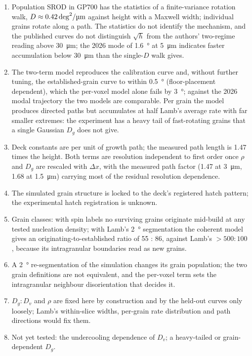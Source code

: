\documentclass[11pt,a4paper]{article}
\newcommand{\Dunit}{\si{deg\squared\per\micro\metre}}
\begin{document}
\begin{enumerate}
\item Population SROD in GP700 has the statistics of a finite-variance rotation walk, $D \approx \SI{0.42}{\Dunit}$ against height with a Maxwell width; individual grains rotate along a path. The statistics do not identify the mechanism, and the published curves do not distinguish $\sqrt{h}$ from the authors' two-regime reading above \SI{30}{\micro\metre}; the 2026 mode of \SI{1.6}{\degree} at \SI{5}{\micro\metre} indicates faster accumulation below \SI{30}{\micro\metre} than the single-$D$ walk gives.
\item The two-term model reproduces the calibration curve and, without further tuning, the established-grain curve to within \SI{0.5}{\degree} (floor-placement dependent), which the per-voxel model alone fails by \SI{3}{\degree}; against the 2026 modal trajectory the two models are comparable. Per grain the model produces directed paths but accumulates at half Lamb's average rate with far smaller extremes: the experiment has a heavy tail of fast-rotating grains that a single Gaussian $D_g$ does not give.
\item Deck constants are per unit of growth path; the measured path length is 1.47 times the height. Both terms are resolution independent to first order once $\rho$ and $D_g$ are rescaled with $\Delta x$, with the measured path factor (1.47 at \SI{3}{\micro\metre}, 1.68 at \SI{1.5}{\micro\metre}) carrying most of the residual resolution dependence.
\item The simulated grain structure is locked to the deck's registered hatch pattern; the experimental hatch registration is unknown.
\item Grain classes: with spin labels no surviving grains originate mid-build at any tested nucleation density; with Lamb's \SI{2}{\degree} segmentation the coherent model gives an originating-to-established ratio of 55 : 86, against Lamb's $> 500 : 100$, because its intragranular boundaries read as new grains.
\item A \SI{2}{\degree} re-segmentation of the simulation changes its grain population; the two grain definitions are not equivalent, and the per-voxel term sets the intragranular neighbour disorientation that decides it.
\item $D_g : D_v$ and $\rho$ are fixed here by construction and by the held-out curves only loosely; Lamb's within-slice widths, per-grain rate distribution and path directions would fix them.
\item Not yet tested: the undercooling dependence of $D_v$; a heavy-tailed or grain-dependent $D_g$.
\end{enumerate}
\end{document}
